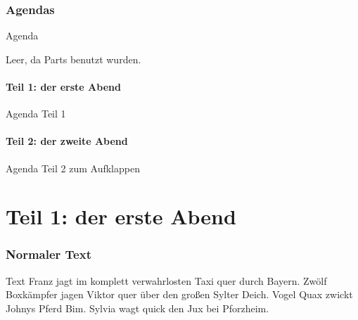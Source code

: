 	\section*{Agendas}

	\begin{frame}{Agenda}
		\tableofcontents

		Leer, da Parts benutzt wurden.
	\end{frame}


	\subsection*{Teil 1: der erste Abend}

	\begin{frame}{Agenda Teil 1}
		\tableofcontents[part=1, subsectionstyle=hide]
	\end{frame}


	\subsection*{Teil 2: der zweite Abend}

	\begin{frame}{Agenda Teil 2 zum Aufklappen}
		\tableofcontents[part=2, pausesections]
	\end{frame}






	\part{Teil 1: der erste Abend}

	\frame{\partpage}

	\section{Normaler Text}

	\begin{frame}{Text}
		Franz jagt im komplett verwahrlosten Taxi quer durch Bayern.
		Zwölf Boxkämpfer jagen Viktor quer über den großen Sylter Deich.
		Vogel Quax zwickt Johnys Pferd Bim.
		Sylvia wagt quick den Jux bei Pforzheim.
	\end{frame}

